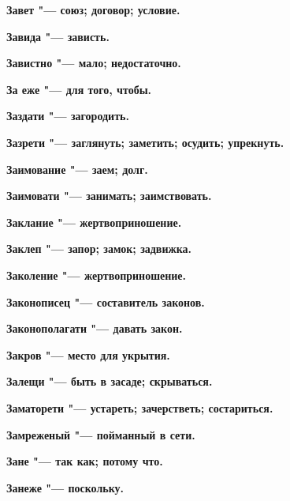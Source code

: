 \bfseries Завет \normalfont{} "--- союз; договор; условие. 




\bfseries Завида \normalfont{} "--- зависть. 




\bfseries Завистно \normalfont{} "--- мало; недостаточно. 




\bfseries За еже \normalfont{} "--- для того, чтобы. 




\bfseries Заздати \normalfont{} "--- загородить. 




\bfseries Зазрети \normalfont{} "--- заглянуть; заметить; осудить; упрекнуть. 




\bfseries Заимование \normalfont{} "--- заем; долг. 




\bfseries Заимовати \normalfont{} "--- занимать; заимствовать. 




\bfseries Заклание \normalfont{} "--- жертвоприношение. 




\bfseries Заклеп \normalfont{} "--- запор; замок; задвижка. 




\bfseries Заколение \normalfont{} "--- жертвоприношение. 




\bfseries Законописец \normalfont{} "--- составитель законов. 




\bfseries Законополагати \normalfont{} "--- давать закон. 




\bfseries Закров \normalfont{} "--- место для укрытия. 




\bfseries Залещи \normalfont{} "--- быть в засаде; скрываться. 




\bfseries Заматорети \normalfont{} "--- устареть; зачерстветь; состариться. 




\bfseries Замреженый \normalfont{} "--- пойманный в сети. 




\bfseries Зане \normalfont{} "--- так как; потому что. 




\bfseries Занеже \normalfont{} "--- поскольку. 




